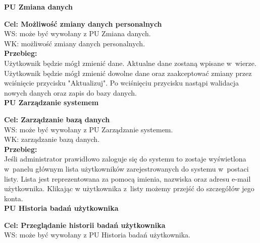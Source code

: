 \documentclass[12pt, letterpaper]{article}
\begin{document}
		\newpage		
		
		\textbf{PU Zmiana danych}
		
		\quad
		
		\textbf{Cel: Możliwość zmiany danych personalnych}\\
		
		WS: może być wywołany z PU Zmiana danych.\\
		
		WK: możliwość zmiany danych personalnych.\\
		
		\textbf{Przebieg:}\\
		Użytkownik będzie mógł zmienić dane. Aktualne dane zostaną wpisane w~wierze. Użytkownik będzie mógł zmienić dowolne dane oraz zaakceptować zmiany przez wciśnięcie przycisku "Aktualizuj". Po wciśnięciu przycisku nastąpi walidacja nowych danych oraz zapis do bazy danych.
		 \\
			
		
		
		\textbf{PU Zarządzanie systemem}
		
		\quad
		
		\textbf{Cel: Zarządzanie bazą danych}\\
		
		WS: może być wywołany z PU Zarządzanie systemem.\\
		
		WK: zarządzanie bazą danych. \\
		
		\textbf{Przebieg:}\\
		Jeśli administrator prawidłowo zaloguje się do systemu to zostaje wyświetlona w~panelu głównym lista użytkowników zarejestrowanych do systemu w~postaci listy. Lista jest reprezentowana za pomocą imienia, nazwiska oraz adresu e-mail użytkownika. Klikając w użytkownika z~listy możemy przejść do szczegółów jego konta.\\	
		
		
		\textbf{PU Historia badań użytkownika}
		
		\quad
		
		\textbf{Cel: Przeglądanie historii badań użytkownika}\\
		
		WS: może być wywołany z PU Historia badań użytkownika.\\
		
\end{document}

